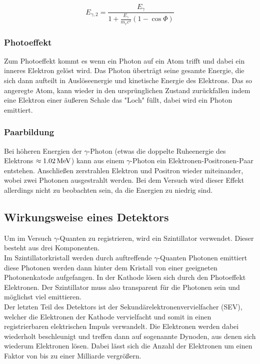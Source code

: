 \documentclass[a4paper,titlepage]{scrartcl}
\numberwithin{equation}{section}
\begin{document}
\begin{equation*}
E_{\gamma,2}=\frac{E_{\gamma}}{1+ \frac{E_{\gamma}}{m_e c^2}\left( 1- \cos{\Phi} \right)}
\end{equation*}

\subsubsection{Photoeffekt}

Zum Photoeffekt kommt es wenn ein Photon auf ein Atom trifft und dabei ein inneres Elektron gelöst wird. Das Photon überträgt seine gesamte Energie, die sich dann aufteilt in Auslöseenergie und kinetische Energie des Elektrons. Das so angeregte Atom, kann wieder in den ursprünglichen Zustand zurückfallen indem eine Elektron einer äußeren Schale das "Loch" füllt, dabei wird ein Photon emittiert.

\subsubsection{Paarbildung}

Bei höheren Energien der $\gamma $-Photon (etwas die doppelte Ruheenergie des Elektrons $\approx \unit[1.02]{MeV}$) kann aus einem $\gamma $-Photon ein Elektronen-Positronen-Paar entstehen. Anschließen zerstrahlen Elektron und Positron wieder miteinander, wobei zwei Photonen ausgestrahlt werden. Bei dem Versuch wird dieser Effekt allerdings nicht zu beobachten sein, da die Energien zu niedrig sind.

\subsection{Wirkungsweise eines Detektors}

Um im Versuch $\gamma $-Quanten zu registrieren, wird ein Szintillator verwendet. Dieser besteht aus drei Komponenten.\\
Im Szintillatorkristall werden durch auftreffende $\gamma $-Quanten Photonen emittiert diese Photonen werden dann hinter dem Kristall von einer geeigneten Photonenkatode aufgefangen. In der Kathode lösen sich durch den Photoeffekt Elektronen. Der Szintillator muss also transparent für die Photonen sein und möglichst viel emittieren.\\ 
Der letzten Teil des Detektors ist der Sekundärelektronenvervielfacher (SEV), welcher die Elektronen der Kathode vervielfacht und somit in einen registrierbaren elektrischen Impuls verwandelt. Die Elektronen werden dabei wiederholt beschleunigt und treffen dann auf sogenannte Dynoden, aus denen sich wiederum Elektronen lösen. Dabei lässt sich die Anzahl der Elektronen um einen Faktor von bis zu einer Milliarde vergrößern.
\end{document}

